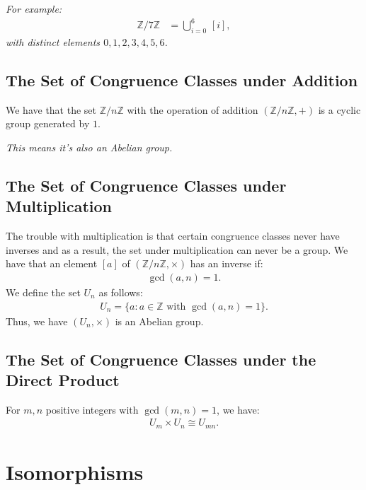 \documentclass[a4paper, 12pt, twoside]{article}
\DeclareMathOperator{\Gcd}{gcd}
\begin{document}
\textit{For example:}
\begin{align*}
      \mathbb{Z}/7\mathbb{Z} & = \bigcup_{i = 0}^{6} \, [i],
\end{align*}
\textit{with distinct elements $0, 1, 2, 3, 4, 5, 6$.}

\newpage

\subsection{The Set of Congruence Classes under Addition}

We have that the set $\mathbb{Z}/n\mathbb{Z}$ with the operation
of addition $(\mathbb{Z}/n\mathbb{Z}, +)$ is a cyclic group
generated by $1$.

\vspace{\baselineskip}

\textit{This means it's also an Abelian group.}

\subsection{The Set of Congruence Classes under Multiplication}

The trouble with multiplication is that certain congruence classes
never have inverses and as a result, the set under multiplication
can never be a group. We have that an element $[a]$ of
$(\mathbb{Z}/n\mathbb{Z}, \times)$ has an inverse if:
\begin{align*}
      \gcd{(a, n)} = 1.
\end{align*}
We define the set $U_n$ as follows:
\begin{align*}
      U_n = \{a : a \in \mathbb{Z} \text{ with } \gcd{(a, n) = 1}\}.
\end{align*}
Thus, we have $(U_n, \times)$ is an Abelian group.

\subsection{The Set of Congruence Classes under the Direct Product}

For $m, n$ positive integers with $\Gcd(m, n) = 1$, we have:
\begin{align*}
      U_m \times U_n \cong U_{mn}.
\end{align*}

\section{Isomorphisms}
\end{document}
